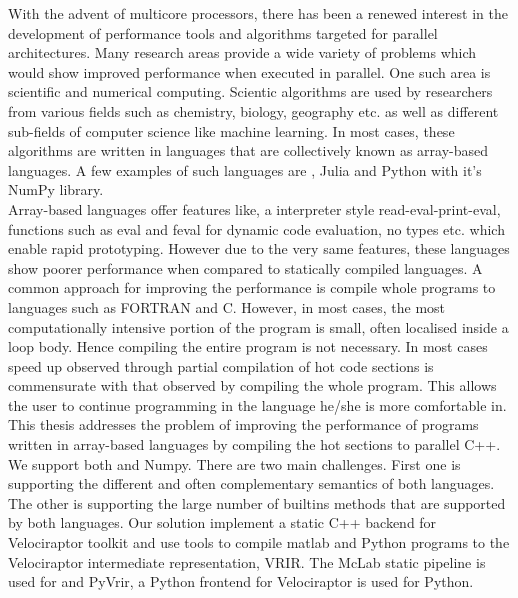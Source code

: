 With the advent of multicore processors, there has been a renewed interest in the development of performance tools and algorithms targeted for parallel architectures. Many research areas  provide a wide variety of problems which would show improved performance when executed in parallel. One such area is scientific and numerical computing. Scientic algorithms are used by researchers from various fields such as chemistry, biology, geography etc. as well as different sub-fields of computer science like machine learning. In most cases, these algorithms are written in languages  that are collectively known as  array-based languages. A few examples of such languages are \matlab\cite{matlab}, Julia\cite{julia} and Python\cite{python} with it's NumPy\cite{numpy} library.\\
Array-based languages offer features like, a interpreter style read-eval-print-eval, functions such as eval and feval for dynamic code evaluation, no types etc. which enable rapid prototyping. However due to the very same features, these languages show poorer performance when compared to statically compiled languages. A common approach for improving the performance is compile whole programs to languages such as {\sc FORTRAN} and C. However, in most cases, the most computationally intensive portion of the program is small, often localised inside a loop body. Hence compiling the entire program is not necessary. In most cases speed up observed through partial compilation of hot code sections is commensurate with that observed by compiling the whole program. This allows the user to continue programming in the language he/she is more comfortable in.\\
This thesis addresses the problem of improving the performance of programs written in array-based languages by compiling the hot sections to parallel C++. We support both \matlab and Numpy. There are two main challenges. First one is supporting the different and often complementary semantics of both languages. The other is supporting the large number of builtins methods that are supported by both languages.
Our solution implement a static C++ backend for Velociraptor\cite{velociraptor} toolkit and use tools to compile matlab and Python programs to the Velociraptor intermediate representation, VRIR. The McLab static pipeline is used for \matlab and PyVrir, a Python frontend for Velociraptor is used for Python. 

